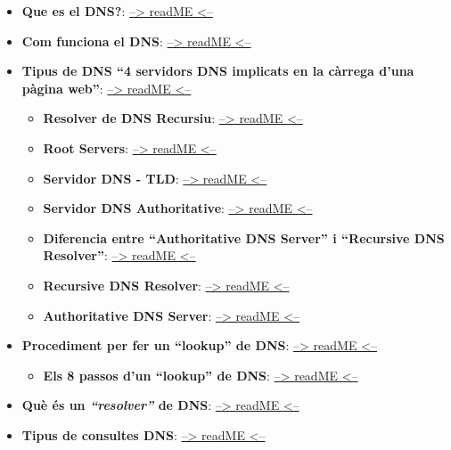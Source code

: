 \documentclass[]{article}
\providecommand{\tightlist}{%
  \setlength{\itemsep}{0pt}\setlength{\parskip}{0pt}}
\begin{document}
\begin{itemize}
\item
  \textbf{Que es el DNS?}:
  \protect\hyperlink{que-es-el-dns}{--\textgreater{} readME
  \textless{}--}
\item
  \textbf{Com funciona el DNS}:
  \protect\hyperlink{com-funciona-el-dns}{--\textgreater{} readME
  \textless{}--}
\item
  \textbf{Tipus de DNS ``4 servidors DNS implicats en la càrrega d'una
  pàgina web''}:
  \protect\hyperlink{tipus-de-dns-ux5cux25224-servidors-dns-implicats-en-la-cuxe0rrega-duna-puxe0gina-webux5cux2522}{--\textgreater{}
  readME \textless{}--}

  \begin{itemize}
  \item
    \textbf{Resolver de DNS Recursiu}:
    \protect\hyperlink{resolver-de-dns-recursiu}{--\textgreater{} readME
    \textless{}--}
  \item
    \textbf{Root Servers}:
    \protect\hyperlink{root-servers}{--\textgreater{} readME
    \textless{}--}
  \item
    \textbf{Servidor DNS - TLD}:
    \protect\hyperlink{servidor-dns---tld}{--\textgreater{} readME
    \textless{}--}
  \item
    \textbf{Servidor DNS Authoritative}:
    \protect\hyperlink{servidor-dns-authoritative}{--\textgreater{}
    readME \textless{}--}
  \item
    \textbf{Diferencia entre ``Authoritative DNS Server'' i ``Recursive
    DNS Resolver''}:
    \protect\hyperlink{diferencia-entre-ux5cux2522authoritative-dns-serverux5cux2522-i-ux5cux2522recursive-dns-resolverux5cux2522}{--\textgreater{}
    readME \textless{}--}
  \item
    \textbf{Recursive DNS Resolver}:
    \protect\hyperlink{recursive-dns-resolver}{--\textgreater{} readME
    \textless{}--}
  \item
    \textbf{Authoritative DNS Server}:
    \protect\hyperlink{authoritative-dns-server}{--\textgreater{} readME
    \textless{}--}
  \end{itemize}
\item
  \textbf{Procediment per fer un ``lookup'' de DNS}:
  \protect\hyperlink{procediment-per-fer-un-ux5cux2522lookupux5cux2522-de-dns}{--\textgreater{}
  readME \textless{}--}

  \begin{itemize}
  \tightlist
  \item
    \textbf{Els 8 passos d'un ``lookup'' de DNS}:
    \protect\hyperlink{els-8-passos-dun-ux5cux2522lookupux5cux2522-de-dns}{--\textgreater{}
    readME \textless{}--}
  \end{itemize}
\item
  \textbf{Què és un \emph{``resolver''} de DNS}:
  \protect\hyperlink{quuxe8-uxe9s-un-ux5cux2522resolverux5cux2522-de-dns}{--\textgreater{}
  readME \textless{}--}
\item
  \textbf{Tipus de consultes DNS}:
  \protect\hyperlink{tipus-de-consultes-dns}{--\textgreater{} readME
  \textless{}--}


\end{itemize}
\end{document}
